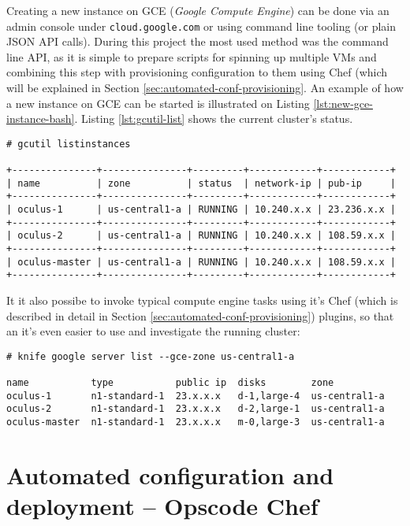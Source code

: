 Creating a new instance on GCE (\textit{Google Compute Engine}) can be done via an admin console under \verb|cloud.google.com| or using command line tooling (or plain JSON API calls). During this project the most used method was the command line API, as it is simple to prepare scripts for spinning up multiple VMs and combining this step with provisioning configuration to them using Chef (which will be explained in Section \ref{sec:automated-conf-provisioning}. An example of how a new instance on GCE can be started is illustrated on Listing \ref{lst:new-gce-instance-bash}. Listing \ref{lst:gcutil-list} shows the current cluster's status.

\label{lst:gcutil-list}
\begin{verbatim}
# gcutil listinstances

+---------------+---------------+---------+------------+------------+
| name          | zone          | status  | network-ip | pub-ip     |
+---------------+---------------+---------+------------+------------+
| oculus-1      | us-central1-a | RUNNING | 10.240.x.x | 23.236.x.x |
+---------------+---------------+---------+------------+------------+
| oculus-2      | us-central1-a | RUNNING | 10.240.x.x | 108.59.x.x |
+---------------+---------------+---------+------------+------------+
| oculus-master | us-central1-a | RUNNING | 10.240.x.x | 108.59.x.x |
+---------------+---------------+---------+------------+------------+
\end{verbatim}

It it also possibe to invoke typical compute engine tasks using it's Chef (which is described in detail in Section \ref{sec:automated-conf-provisioning}) plugins, so that an it's even easier to use and investigate the running cluster:

\begin{verbatim}
# knife google server list --gce-zone us-central1-a

name           type           public ip  disks        zone           
oculus-1       n1-standard-1  23.x.x.x   d-1,large-4  us-central1-a  
oculus-2       n1-standard-1  23.x.x.x   d-2,large-1  us-central1-a  
oculus-master  n1-standard-1  23.x.x.x   m-0,large-3  us-central1-a  
\end{verbatim}


\label{sec:automated-conf-provisioning}
\section{Automated configuration and deployment -- Opscode Chef}

